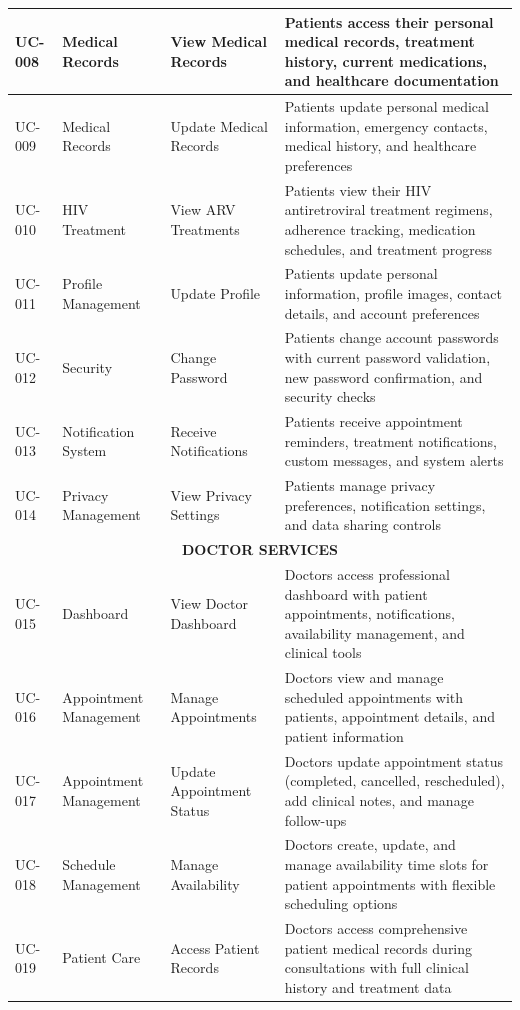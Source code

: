 \documentclass[12pt,a4paper]{article}
\begin{document}
\begin{longtable}{|p{1cm}|p{3.5cm}|p{3.5cm}|p{6cm}|}
\hline
UC-008 & Medical Records & View Medical Records & Patients access their personal medical records, treatment history, current medications, and healthcare documentation \\
\hline
UC-009 & Medical Records & Update Medical Records & Patients update personal medical information, emergency contacts, medical history, and healthcare preferences \\
\hline
UC-010 & HIV Treatment & View ARV Treatments & Patients view their HIV antiretroviral treatment regimens, adherence tracking, medication schedules, and treatment progress \\
\hline
UC-011 & Profile Management & Update Profile & Patients update personal information, profile images, contact details, and account preferences \\
\hline
UC-012 & Security & Change Password & Patients change account passwords with current password validation, new password confirmation, and security checks \\
\hline
UC-013 & Notification System & Receive Notifications & Patients receive appointment reminders, treatment notifications, custom messages, and system alerts \\
\hline
UC-014 & Privacy Management & View Privacy Settings & Patients manage privacy preferences, notification settings, and data sharing controls \\
\hline
\multicolumn{4}{|c|}{\textbf{DOCTOR SERVICES}} \\
\hline
UC-015 & Dashboard & View Doctor Dashboard & Doctors access professional dashboard with patient appointments, notifications, availability management, and clinical tools \\
\hline
UC-016 & Appointment Management & Manage Appointments & Doctors view and manage scheduled appointments with patients, appointment details, and patient information \\
\hline
UC-017 & Appointment Management & Update Appointment Status & Doctors update appointment status (completed, cancelled, rescheduled), add clinical notes, and manage follow-ups \\
\hline
UC-018 & Schedule Management & Manage Availability & Doctors create, update, and manage availability time slots for patient appointments with flexible scheduling options \\
\hline
UC-019 & Patient Care & Access Patient Records & Doctors access comprehensive patient medical records during consultations with full clinical history and treatment data \\

\end{longtable}
\end{document}
